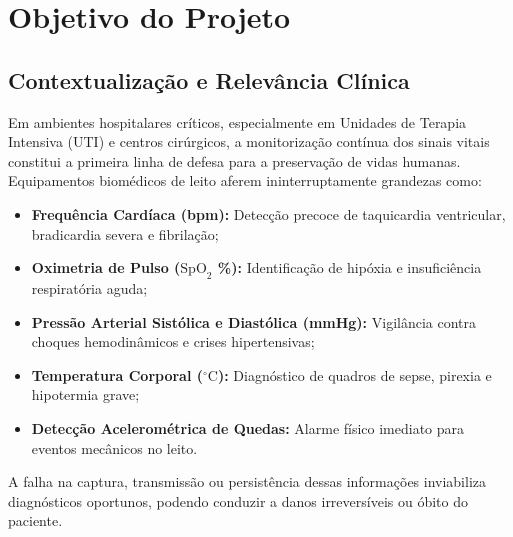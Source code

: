 \documentclass[12pt,a4paper]{article}
\begin{document}
\newpage

\section{Objetivo do Projeto}
\label{sec:objetivo}

\subsection{Contextualização e Relevância Clínica}
Em ambientes hospitalares críticos, especialmente em Unidades de Terapia Intensiva (UTI) e centros cirúrgicos, a monitorização contínua dos sinais vitais constitui a primeira linha de defesa para a preservação de vidas humanas. Equipamentos biomédicos de leito aferem ininterruptamente grandezas como:
\begin{itemize}
	\item \textbf{Frequência Cardíaca (bpm):} Detecção precoce de taquicardia ventricular, bradicardia severa e fibrilação;
	\item \textbf{Oximetria de Pulso ($\text{SpO}_2$ \%):} Identificação de hipóxia e insuficiência respiratória aguda;
	\item \textbf{Pressão Arterial Sistólica e Diastólica (mmHg):} Vigilância contra choques hemodinâmicos e crises hipertensivas;
	\item \textbf{Temperatura Corporal ($^\circ\text{C}$):} Diagnóstico de quadros de sepse, pirexia e hipotermia grave;
	\item \textbf{Detecção Acelerométrica de Quedas:} Alarme físico imediato para eventos mecânicos no leito.
\end{itemize}

A falha na captura, transmissão ou persistência dessas informações inviabiliza diagnósticos oportunos, podendo conduzir a danos irreversíveis ou óbito do paciente.
\end{document}
